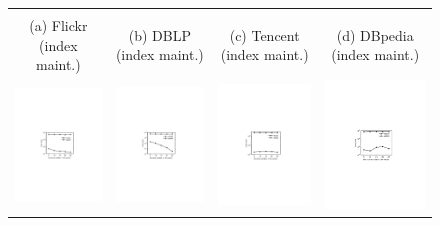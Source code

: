 \begin{figure}[htp]
\begin{tabular}{c c c c}
\begin{minipage}{3.76cm}
  \end{minipage}
  \\
  \small (a) Flickr (index maint.)
  &
  \small (b) DBLP (index maint.)
  &
  \small (c) Tencent (index maint.)
  &
  \small (d) DBpedia (index  maint.)
  \\
 \begin{minipage}{3.76cm}
  \includegraphics[width=3.725cm]{figures/flickrMix}
  \end{minipage}
  &
  \begin{minipage}{3.76cm}
  \includegraphics[width=3.725cm]{figures/dblpMix}
  \end{minipage}
  &
  \begin{minipage}{3.76cm}
  \includegraphics[width=3.725cm]{figures/tencentMix}
  \end{minipage}
  &
  \begin{minipage}{3.76cm}
  \includegraphics[width=3.725cm]{figures/dbpediaMix}

\end{minipage}
\end{tabular}
\end{figure}
